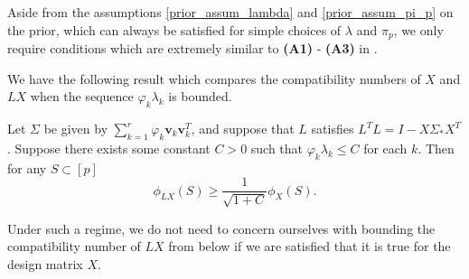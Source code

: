 \documentclass[11pt]{article}
\newcommand{\postCov}{\Sigma_*}
\numberwithin{equation}{section}
\begin{document}
Aside from the assumptions \eqref{prior_assum_lambda} and \eqref{prior_assum_pi_p} on the prior, which can always be satisfied for simple choices of $\lambda$ and $\pi_p$, we only require conditions which are extremely similar to {\bf (A1)} - {\bf (A3)} in \cite{CBM2020}.



We have the following result which compares the compatibility numbers of $X$ and $LX$ when the sequence $\varphi_k \lambda_k$ is bounded.
\begin{lemma}\label{lem:compatibility_relation}
	Let $\Sigma$ be given by $\sum_{k = 1}^r \varphi_k \mathbf{v}_k \mathbf{v}_k^T$, and suppose that $L$ satisfies $L^TL = I - X\postCov X^T$. Suppose there exists some constant $C > 0$ such that $\varphi_k \lambda_k \leq C$ for each $k$. Then for any $S \subset [p]$
	$$
	\phi_{LX}(S) \geq \frac{1}{\sqrt{1+C}} \phi_X(S).
	$$
\end{lemma}
Under such a regime, we do not need to concern ourselves with bounding the compatibility number of $LX$ from below if we are satisfied that it is true for the design matrix $X$. 
\end{document}

